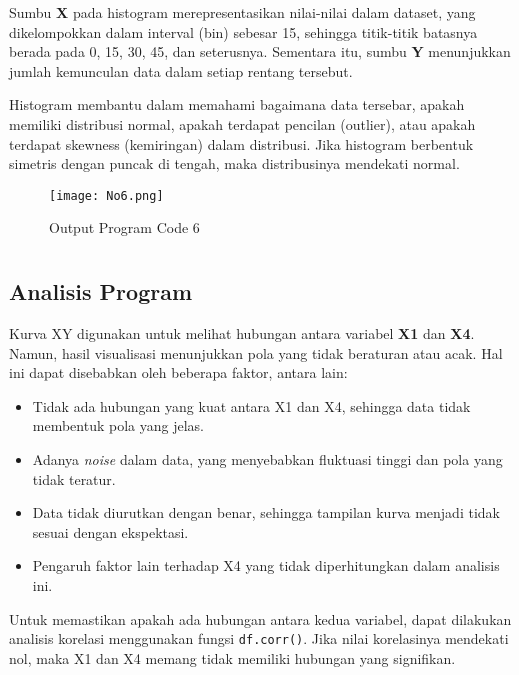 \documentclass[
  course = {{Data Visualisasi dan Pemrosesan Citra}},
  assignment = 2,
  name = {{Dosen Pengampu Matkul 1 ; Dosen Pengampu Matkul 2}},
  studentnumber = {{ ; }},
  email = {{Prof. Dr. Suprijadi, M.Eng. ; Dr. Irfan Dwi Aditya, S.Si., M.Si.}},
  firstexercise = 1
]{aga-homework}
\begin{document}
Sumbu \textbf{X} pada histogram merepresentasikan nilai-nilai dalam dataset, yang dikelompokkan dalam interval (bin) sebesar 15, sehingga titik-titik batasnya berada pada 0, 15, 30, 45, dan seterusnya. Sementara itu, sumbu \textbf{Y} menunjukkan jumlah kemunculan data dalam setiap rentang tersebut.

Histogram membantu dalam memahami bagaimana data tersebar, apakah memiliki distribusi normal, apakah terdapat pencilan (outlier), atau apakah terdapat skewness (kemiringan) dalam distribusi. Jika histogram berbentuk simetris dengan puncak di tengah, maka distribusinya mendekati normal.


\exercise[6]
\nolinenumbers
    
\linenumbers

\begin{figure}[h!]
    \centering
    \texttt{[image: No6.png]}
    \caption{Output Program Code 6}
    \label{fig:enter-label}
\end{figure}
\section{}
\subsection{Analisis Program}

Kurva XY digunakan untuk melihat hubungan antara variabel \textbf{X1} dan \textbf{X4}. Namun, hasil visualisasi menunjukkan pola yang tidak beraturan atau acak. Hal ini dapat disebabkan oleh beberapa faktor, antara lain:  

\begin{itemize}
    \item Tidak ada hubungan yang kuat antara X1 dan X4, sehingga data tidak membentuk pola yang jelas.
    \item Adanya \textit{noise} dalam data, yang menyebabkan fluktuasi tinggi dan pola yang tidak teratur.
    \item Data tidak diurutkan dengan benar, sehingga tampilan kurva menjadi tidak sesuai dengan ekspektasi.
    \item Pengaruh faktor lain terhadap X4 yang tidak diperhitungkan dalam analisis ini.
\end{itemize}  

Untuk memastikan apakah ada hubungan antara kedua variabel, dapat dilakukan analisis korelasi menggunakan fungsi \texttt{df.corr()}. Jika nilai korelasinya mendekati nol, maka X1 dan X4 memang tidak memiliki hubungan yang signifikan.
\end{document}
